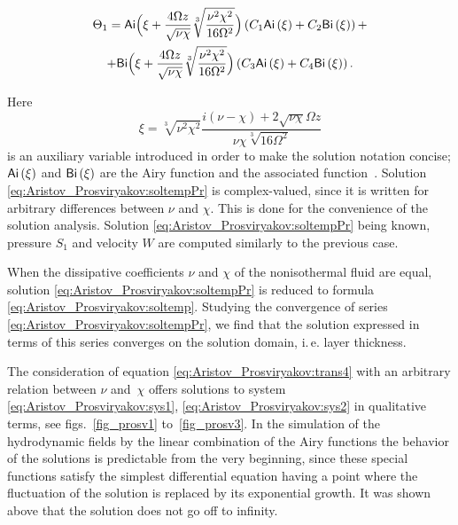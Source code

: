 \begin{multline}

\label{eq:Aristov_Prosviryakov:soltempPr}

\Theta_1=\text{\sf Ai}\Bigl(\xi+\frac{4\Omega z}{\sqrt{\nu\chi}}\sqrt[3]{\frac{\nu^2\chi^2} {16\Omega^2}}\Bigr)

\left(C_1\text{\sf Ai}\left(\xi\right)+C_2\text{\sf Bi}\left(\xi\right)\right)+

\\

+\text{\sf Bi}\Bigl(\xi+\frac{4\Omega z}{\sqrt{\nu\chi}}\sqrt[3]{\frac{\nu^2\chi^2}{16\Omega^2}}\Bigr)\left(C_3\text{\sf Ai}\left(\xi\right)+C_4\text{\sf Bi}\left(\xi\right)\right).

\end{multline}

Here $$\xi=\sqrt[3]{\nu^2\chi^2}\displaystyle\frac{ i\left(\nu-\chi\right)+2\sqrt{\nu\chi}\Omega z}{\nu\chi\sqrt[3]{16\Omega^2}}$$ is an auxiliary variable introduced in order to make the solution notation concise;  $\text{\sf Ai} \left(\xi\right)$   and $\text{\sf Bi}\left(\xi\right)$  are the Airy function and the associated function~\cite{ulg:bib:Polyanin}. Solution \eqref{eq:Aristov_Prosviryakov:soltempPr} is complex-valued, since it is written for arbitrary differences between $\nu$  and $\chi.$  This is done for the convenience of the solution analysis. Solution \eqref{eq:Aristov_Prosviryakov:soltempPr} being known, pressure  $S_1$ and velocity $W$ are computed similarly to the previous case.	



When the dissipative coefficients  $\nu$ and  $\chi$ of the nonisothermal fluid are equal, solution \eqref{eq:Aristov_Prosviryakov:soltempPr}  is reduced to formula \eqref{eq:Aristov_Prosviryakov:soltemp}. Studying the convergence of series \eqref{eq:Aristov_Prosviryakov:soltempPr}, we find that the solution expressed in terms of this series converges on the solution domain, i.\,e. layer thickness. 



The consideration of equation \eqref{eq:Aristov_Prosviryakov:trans4} with an arbitrary relation between $\nu$  and~$\chi$ offers solutions to system \eqref{eq:Aristov_Prosviryakov:sys1}, \eqref{eq:Aristov_Prosviryakov:sys2} in qualitative terms, see figs.~\ref{fig_prosv1} to~\ref{fig_prosv3}. In the simulation of the hydrodynamic fields by the linear combination of the Airy functions the behavior of the solutions is predictable from the very beginning, since these special functions satisfy the simplest differential equation having a point where the fluctuation of the solution is replaced by its exponential growth. It was shown above that the solution does not go off to infinity.



